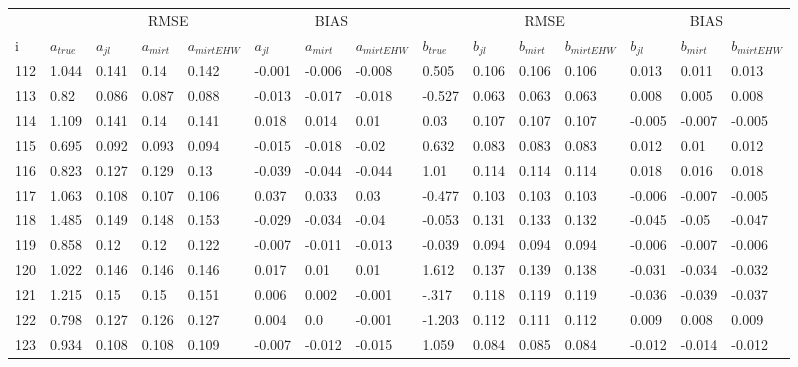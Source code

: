 \begin{table}
	\renewcommand{\arraystretch}{1}%
	\footnotesize
	\centering \begin{tabular}{|l|l|lll|lll|l|lll|lll}
		& &  \multicolumn{3}{c}{RMSE}& \multicolumn{3}{c}{BIAS}& & \multicolumn{3}{c}{RMSE}& \multicolumn{3}{c}{BIAS} \\
		i & $a_{true}$ & $a_{jl}$ & $a_{mirt}$ & $a_{mirt EHW}$ & $ a_{jl} $ & $ a_{mirt} $ & $ a_{mirt EHW} $ & $ b_{true} $ & $ b_{jl} $ & $ b_{mirt} $ & $ b_{mirt EHW} $ & $ b_{jl} $ & $b_{mirt}$ & $b_{mirt EHW}$\\
		\hline
		112 & 1.044 & 0.141 & 0.14 & 0.142 & -0.001 & -0.006 & -0.008 & 0.505 & 0.106 & 0.106 & 0.106 & 0.013 & 0.011 & 0.013 \\
		113 & 0.82 & 0.086 & 0.087 & 0.088 & -0.013 & -0.017 & -0.018 & -0.527 & 0.063 & 0.063 & 0.063 & 0.008 & 0.005 & 0.008 \\
		114 & 1.109 & 0.141 & 0.14 & 0.141 & 0.018 & 0.014 & 0.01 & 0.03 & 0.107 & 0.107 & 0.107 & -0.005 & -0.007 & -0.005 \\
		115 & 0.695 & 0.092 & 0.093 & 0.094 & -0.015 & -0.018 & -0.02 & 0.632 & 0.083 & 0.083 & 0.083 & 0.012 & 0.01 & 0.012 \\
		116 & 0.823 & 0.127 & 0.129 & 0.13 & -0.039 & -0.044 & -0.044 & 1.01 & 0.114 & 0.114 & 0.114 & 0.018 & 0.016 & 0.018 \\
		117 & 1.063 & 0.108 & 0.107 & 0.106 & 0.037 & 0.033 & 0.03 & -0.477 & 0.103 & 0.103 & 0.103 & -0.006 & -0.007 & -0.005 \\
		118 & 1.485 & 0.149 & 0.148 & 0.153 & -0.029 & -0.034 & -0.04 & -0.053 & 0.131 & 0.133 & 0.132 & -0.045 & -0.05 & -0.047 \\
		119 & 0.858 & 0.12 & 0.12 & 0.122 & -0.007 & -0.011 & -0.013 & -0.039 & 0.094 & 0.094 & 0.094 & -0.006 & -0.007 & -0.006 \\
		120 & 1.022 & 0.146 & 0.146 & 0.146 & 0.017 & 0.01 & 0.01 & 1.612 & 0.137 & 0.139 & 0.138 & -0.031 & -0.034 & -0.032 \\
		121 & 1.215 & 0.15 & 0.15 & 0.151 & 0.006 & 0.002 & -0.001 & -.317 & 0.118 & 0.119 & 0.119 & -0.036 & -0.039 & -0.037 \\
		122 & 0.798 & 0.127 & 0.126 & 0.127 & 0.004 & 0.0 & -0.001 & -1.203 & 0.112 & 0.111 & 0.112 & 0.009 & 0.008 & 0.009 \\
		123 & 0.934 & 0.108 & 0.108 & 0.109 & -0.007 & -0.012 & -0.015 & 1.059 & 0.084 & 0.085 & 0.084 & -0.012 & -0.014 & -0.012 \\

\end{tabular}
\end{table}
